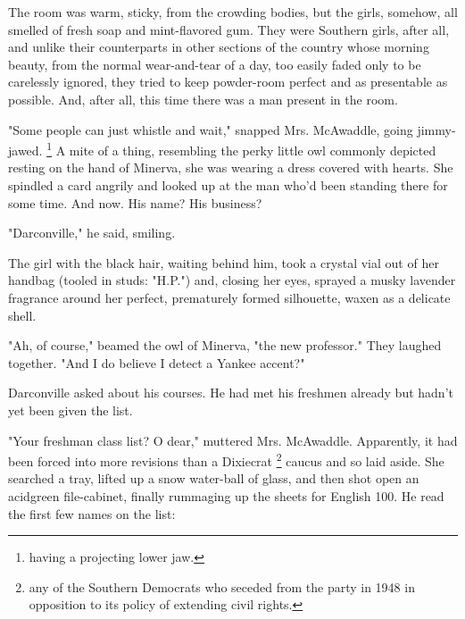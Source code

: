   The room was warm, sticky, from the crowding bodies, but the girls, somehow,
all smelled of fresh soap and mint-flavored gum. They were Southern girls, after
all, and unlike their counterparts in other sections of the country whose
morning beauty, from the normal wear-and-tear of a day, too easily faded only to
be carelessly ignored, they tried to keep powder-room perfect and as presentable
as possible. And, after all, this time there was a man present in the room.

  "Some people can just whistle and wait," snapped 
Mrs. McAwaddle, going jimmy-jawed. 
\footnote{ having a projecting lower jaw.}
A mite 
of a thing, resembling the perky 
little owl commonly depicted resting on the hand of Minerva, she was wearing a 
dress covered with hearts. She spindled 
a card angrily and looked up at the man who'd been standing
there for some time. And now. His name? His business?

  "Darconville," he said, smiling.

  The girl with the black hair, waiting behind him, took a crystal vial 
out of her handbag (tooled in studs: "H.P.") and, closing her eyes, sprayed a 
musky lavender fragrance around her perfect, prematurely formed silhouette, 
waxen 
as a delicate shell.

  "Ah, of course," beamed the owl of Minerva, "the new professor." They laughed
together. "And I do believe I detect a Yankee accent?"

  Darconville asked about his courses. He had met his freshmen already but
hadn't yet been given the list.

  "Your freshman class list? O dear," muttered Mrs. McAwaddle. Apparently, it
had been forced into more revisions than a Dixiecrat 
\footnote{any of the Southern Democrats who seceded from the party in 1948 in
  opposition to its policy of extending civil rights.}
caucus 
and so laid aside. She searched a tray, lifted up a snow water-ball of glass, 
and then shot open an acidgreen file-cabinet, finally rummaging 
up the sheets for English 100. He read the first few names on the list:
 
